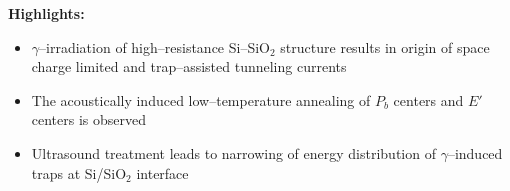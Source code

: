 \documentclass[preprint]{elsarticle}
\begin{document}
\textbf{Highlights:}

\begin{itemize}
  \item $\gamma$--irradiation of high--resistance  Si--SiO$_2$ structure results in origin of space charge limited and trap--assisted tunneling currents
  \item The acoustically induced low--temperature annealing of
      $P_b$ centers and $E'$ centers is observed
  \item Ultrasound treatment leads to narrowing of energy distribution of $\gamma$--induced traps at Si/SiO$_2$  interface
\end{itemize}
\end{document}
